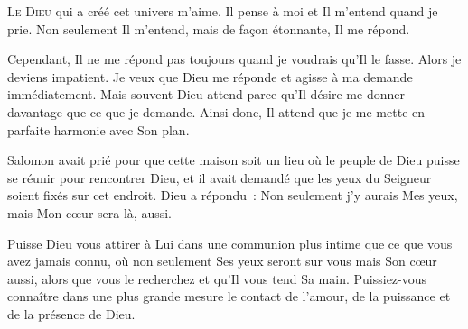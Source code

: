 


\lettrine{L}{e Dieu} qui a créé cet univers m'aime.
 Il pense à moi et Il m'entend quand je prie.
 Non seulement Il m'entend, mais de façon étonnante, Il me répond.

Cependant, Il ne me répond pas toujours quand je voudrais qu'Il le fasse.
 Alors je deviens impatient. Je veux que Dieu me réponde
 et agisse à ma demande immédiatement.
 Mais souvent Dieu attend parce qu'Il désire me donner davantage
 que ce que je demande.
 Ainsi donc, Il attend que je me mette en parfaite harmonie avec Son plan. 

Salomon avait prié pour que cette maison soit un lieu où le peuple de Dieu
 puisse se réunir pour rencontrer Dieu, et il avait demandé
 que les yeux du Seigneur soient fixés sur cet endroit.
 Dieu a répondu~:
 \og Non seulement j'y aurais Mes yeux,
 mais Mon c\oe{}ur sera là, aussi. \fg{}


Puisse Dieu vous attirer à Lui dans une communion plus intime
 que ce que vous avez jamais connu, où non seulement Ses yeux seront sur vous
 mais Son c\oe{}ur aussi, alors que vous le recherchez
 et qu'Il vous tend Sa main.
 Puissiez-vous connaître dans une plus grande mesure le contact de l'amour,
 de la puissance et de la présence de Dieu. 

\dvrule






